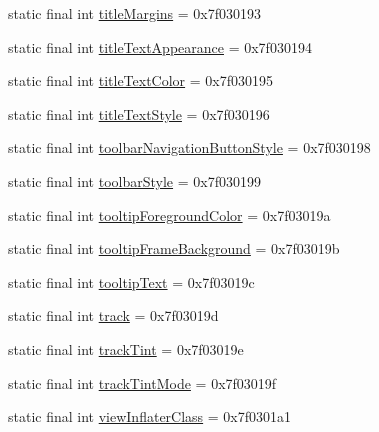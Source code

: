 \begin{DoxyCompactItemize}
static final int \mbox{\hyperlink{classcom_1_1synnapps_1_1carouselview_1_1_r_1_1attr_a8a4e37c35f9c962c033c516f51f4e483}{title\+Margins}} = 0x7f030193
\item 
static final int \mbox{\hyperlink{classcom_1_1synnapps_1_1carouselview_1_1_r_1_1attr_a779a3da4efaad2ddc850b06f00ef2f48}{title\+Text\+Appearance}} = 0x7f030194
\item 
static final int \mbox{\hyperlink{classcom_1_1synnapps_1_1carouselview_1_1_r_1_1attr_abc9d5a2dff4a4d9057d82e90a8ed7e12}{title\+Text\+Color}} = 0x7f030195
\item 
static final int \mbox{\hyperlink{classcom_1_1synnapps_1_1carouselview_1_1_r_1_1attr_afeae6fb3768af4aa780382092826c973}{title\+Text\+Style}} = 0x7f030196
\item 
static final int \mbox{\hyperlink{classcom_1_1synnapps_1_1carouselview_1_1_r_1_1attr_a1b5b40ebe347facccac38d65d7414bec}{toolbar\+Navigation\+Button\+Style}} = 0x7f030198
\item 
static final int \mbox{\hyperlink{classcom_1_1synnapps_1_1carouselview_1_1_r_1_1attr_a7d5237ff5a198a8eca70d79679ff3983}{toolbar\+Style}} = 0x7f030199
\item 
static final int \mbox{\hyperlink{classcom_1_1synnapps_1_1carouselview_1_1_r_1_1attr_af04d0f283537d4952e80d3ea70531a9a}{tooltip\+Foreground\+Color}} = 0x7f03019a
\item 
static final int \mbox{\hyperlink{classcom_1_1synnapps_1_1carouselview_1_1_r_1_1attr_a1f80351ab4bb0edbf8b18a9470a80d99}{tooltip\+Frame\+Background}} = 0x7f03019b
\item 
static final int \mbox{\hyperlink{classcom_1_1synnapps_1_1carouselview_1_1_r_1_1attr_a2fcf47f448f2c072b95604d7156476e8}{tooltip\+Text}} = 0x7f03019c
\item 
static final int \mbox{\hyperlink{classcom_1_1synnapps_1_1carouselview_1_1_r_1_1attr_aa58b8e047ce63e6ab4e3540fbe7a93ba}{track}} = 0x7f03019d
\item 
static final int \mbox{\hyperlink{classcom_1_1synnapps_1_1carouselview_1_1_r_1_1attr_a5136e048813c0d200715fc2254004269}{track\+Tint}} = 0x7f03019e
\item 
static final int \mbox{\hyperlink{classcom_1_1synnapps_1_1carouselview_1_1_r_1_1attr_a91eb719ac4c8e8f8ddb3245ba44b053e}{track\+Tint\+Mode}} = 0x7f03019f
\item 
static final int \mbox{\hyperlink{classcom_1_1synnapps_1_1carouselview_1_1_r_1_1attr_af4cba53bbaae86c058be318724be2e71}{view\+Inflater\+Class}} = 0x7f0301a1
\item 

\end{DoxyCompactItemize}
